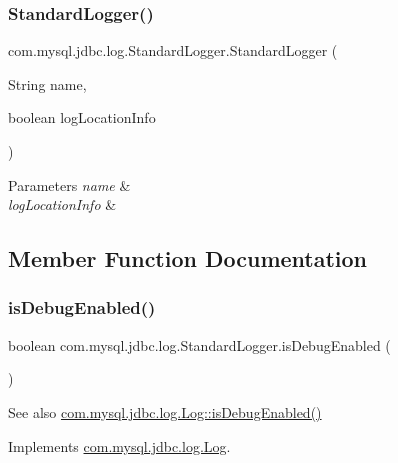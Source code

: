 \subsubsection{\texorpdfstring{Standard\+Logger()}{StandardLogger()}\hspace{0.1cm}{\footnotesize\ttfamily [2/2]}}
{\footnotesize\ttfamily com.\+mysql.\+jdbc.\+log.\+Standard\+Logger.\+Standard\+Logger (\begin{DoxyParamCaption}\item[{String}]{name,  }\item[{boolean}]{log\+Location\+Info }\end{DoxyParamCaption})}


\begin{DoxyParams}{Parameters}
{\em name} & \\
\hline
{\em log\+Location\+Info} & \\
\hline
\end{DoxyParams}


\subsection{Member Function Documentation}
\mbox{\label{classcom_1_1mysql_1_1jdbc_1_1log_1_1_standard_logger_a0072ae8133e26e8422791592ea7724da}} 
\subsubsection{\texorpdfstring{is\+Debug\+Enabled()}{isDebugEnabled()}}
{\footnotesize\ttfamily boolean com.\+mysql.\+jdbc.\+log.\+Standard\+Logger.\+is\+Debug\+Enabled (\begin{DoxyParamCaption}{ }\end{DoxyParamCaption})}

\begin{DoxySeeAlso}{See also}
\mbox{\hyperlink{interfacecom_1_1mysql_1_1jdbc_1_1log_1_1_log_a2e59f38e2359e90879c658cfb2f4e518}{com.\+mysql.\+jdbc.\+log.\+Log\+::is\+Debug\+Enabled()}} 
\end{DoxySeeAlso}


Implements \mbox{\hyperlink{interfacecom_1_1mysql_1_1jdbc_1_1log_1_1_log_a2e59f38e2359e90879c658cfb2f4e518}{com.\+mysql.\+jdbc.\+log.\+Log}}.

